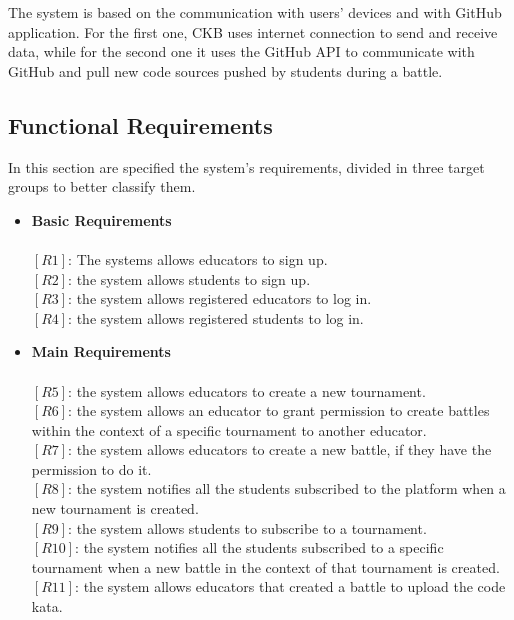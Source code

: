 The system is based on the communication with users' devices and with GitHub application. For the first one, CKB uses internet connection to send and receive data, while for the second one it uses the GitHub API to communicate with GitHub and pull new code sources pushed by students during a battle. 


\newpage

\subsection{Functional Requirements}
In this section are specified the system's requirements, divided in three target groups to better classify them.

\vspace{20pt}

\begin{itemize}
    \item \textbf{Basic Requirements}
    \\
    \\$[R1]$: The systems allows educators to sign up.
    \\$[R2]$: the system allows students to sign up.
    \\$[R3]$: the system allows registered educators to log in.
    \\$[R4]$: the system allows registered students to log in.
    \\
    \item \textbf{Main Requirements} 
    \\
    \\$[R5]$: the system allows educators to create a new tournament.
    \\$[R6]$: the system allows an educator to grant permission to create battles within the context of a specific tournament to another educator.
    \\$[R7]$: the system allows educators to create a new battle, if they have the permission to do it.
    \\$[R8]$: the system notifies all the students subscribed to the platform when a new tournament is created.
    \\$[R9]$: the system allows students to subscribe to a tournament.
    \\$[R10]$: the system notifies all the students subscribed to a specific tournament when a new battle in the context of that tournament is created.
    \\$[R11]$: the system allows educators that created a battle to upload the code kata.

\end{itemize}
